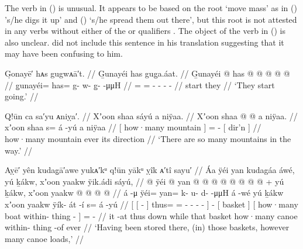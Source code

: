 The verb  in (\lastx) is unusual.
It appears to be based on the root  ‘move mass’ as in  () ’s/he digs it up’ and  () ‘s/he spread them out there’, but this root is not attested in any verbs without either of the  or  qualifiers \parencite[29–25]{leer:1976}.
The object of the verb in (\lastx) is also unclear.
\citeauthor{swanton:1909} did not include this sentence in his translation suggesting that it may have been confusing to him.

\ex\label{ex:92-159-started-going}%
%
\begingl
	\glpreamble	G̣onayē′ hᴀs gugwᴀā′t. //
	\glpreamble	G̱unayéi has gug̱a.áat. //
	\gla	G̱unayéi @ has @  @ {} @ {} @ {} @ {}  //
	\glb	g̱unayéi= has= g- w- g̱-  -μμH //
	\glc	{}= = - - -  - //
	\gld	start they  {} {} {} {} //
	\glft	‘They start going.’
		//
\endgl
\xe

\ex\label{ex:92-160-many-mountains-direction}%
%
\begingl
	\glpreamble	Q!ūn ca sa′yu ᴀniỵa′. //
	\glpreamble	Xʼoon shaa sáyú a niÿaa. //
	\gla	{} Xʼoon shaa {}  @ {} @ {}
		{} a niÿaa. {} //
	\glb	{} xʼoon shaa {} s= á -yú
		{} a niÿaa {}  //
	\glc	{}[ how·many mountain {}] =  -
		{}[  dir’n {}] //
	\gld	{} how·many mountain {} ever\·  {}
		{} its direction {} //
	\glft	‘There are so many mountains in the way.’
		//
\endgl
\xe

\ex\label{ex:92-161-stored-baskets-canoeloads}%
%
\begingl
	\glpreamble	Aỵē′ yên kudag̣ā′awe yukᴀ′kᵘ q!ūn yākᵘ ỵîk ᴀ′tî sayu′ //
	\glpreamble	Áa ÿéi yan kudagáa áwé, yú ḵákw, xʼoon yaakw ÿik.ádi sáyú, //
	\gla	{} {}  @ {} {}
			ÿéi @ yan @  @ {} @ {} @ {} @ {} @ {} @ {} {}
		 @ {} +
		{} yú ḵákw, {}
		{} xʼoon yaakw  @ {} @ {} {}
		 @ {} @ {} //
	\glb	{} {} á -μ {} ÿéi= yan= k- u- {} d-  -μμH {} {}
		á -wé
		{} yú ḵákw {}
		{} xʼoon yaakw ÿík- át -í {}
		s= á -yú //
	\glc	{}[ {}[  - {}]
			thus= = - - \· -
				 - \· {}]
		 -
		{}[  basket {}]
		{}[ how·many boat within- thing - {}]
		=  - //
	\gld	{} {} it -at {} thus down
			 {} {} {} {} {} while {}
		 {}
		{} that basket {}
		{} how·many canoe within- thing -of {}
		ever\·  {} //
	\glft	‘Having been stored there, (in) those baskets, however many canoe loads,’
		//
\endgl
\xe

